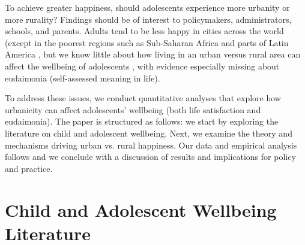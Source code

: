 \documentclass[10pt, letterpaper]{article}
\begin{document}
\begin{spacing}{1.4}
To achieve greater happiness, should adolescents experience more urbanity or more rurality? Findings should be of interest to policymakers, administrators, schools, and 
parents. Adults tend to be less happy in cities across the world
(except in the poorest regions such as Sub-Saharan Africa and parts of Latin
America \citep{aok21,valente2016}, but we know little about how living in an
urban versus rural area can affect the wellbeing of adolescents
\citep{marquez24}, with evidence especially missing about eudaimonia (self-assessed meaning in life).  

To address these issues,  we conduct quantitative analyses that explore how
urbanicity can affect adolescents'  wellbeing (both life satisfaction and
eudaimonia). The paper is structured as follows: we start by exploring the
literature on child and adolescent wellbeing. Next, we examine the theory and
mechanisms driving urban vs. rural happiness. %
Our data and
empirical analysis follows and we conclude with a discussion of results and
implications for policy and practice.


\section*{Child and Adolescent  Wellbeing Literature}




\end{spacing}
\end{document}

